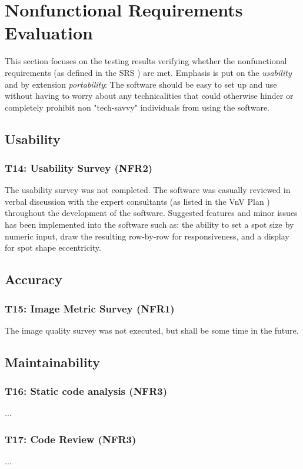 \documentclass[12pt, titlepage]{article}
\begin{document}
\newpage
\clearpage

\section{Nonfunctional Requirements Evaluation}
This section focuses on the testing results verifying whether the nonfunctional requirements
(as defined in the SRS \cite{SRS}) are met. Emphasis is put on the \textit{usability} and
by extension \textit{portability}: The software should be easy to set up and use without
having to worry about any technicalities that could otherwise hinder or completely
prohibit non "tech-savvy" individuals from using the software.

\subsection{Usability}
\subsubsection{T14: Usability Survey (NFR2)}
The usability survey was not completed. The software was casually reviewed in verbal discussion
with the expert consultants (as listed in the VnV Plan \cite{VnV_plan})
throughout the development of the software. Suggested features and minor issues has been
implemented into the software such as: the ability to set a spot size by numeric input,
draw the resulting row-by-row for responsiveness, and a display for spot shape eccentricity.

\subsection{Accuracy}
\subsubsection{T15: Image Metric Survey (NFR1)}
The image quality survey was not executed, but shall be some time in the future.

\subsection{Maintainability}
\subsubsection{T16: Static code analysis (NFR3)}
...
\subsubsection{T17: Code Review (NFR3)}
...
\end{document}
